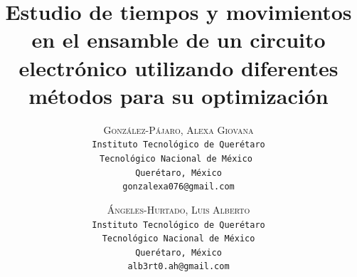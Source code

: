     \lfoot{ \thepage}
    
    \setlength{\droptitle}{-5\baselineskip} %
    \title{\textbf{Estudio de tiempos y movimientos en el ensamble de un circuito electrónico utilizando diferentes métodos para su optimización }} %
    
     \author{ 
     \textsc{González-Pájaro, Alexa Giovana}\\ 
     \texttt{ Instituto Tecnológico de Querétaro } \\ 
     \texttt{Tecnológico Nacional de México } \\ 
     \texttt{Querétaro, México}\\ 
     \texttt{gonzalexa076@gmail.com} 
     \and 
     \textsc{Ángeles-Hurtado, Luis Alberto}\\ 
     \texttt{ Instituto Tecnológico de Querétaro } \\ 
     \texttt{ Tecnológico Nacional de México } \\ 
     \texttt{Querétaro, México}\\ 
     \texttt{alb3rt0.ah@gmail.com} 
    }
    
    
    
    
